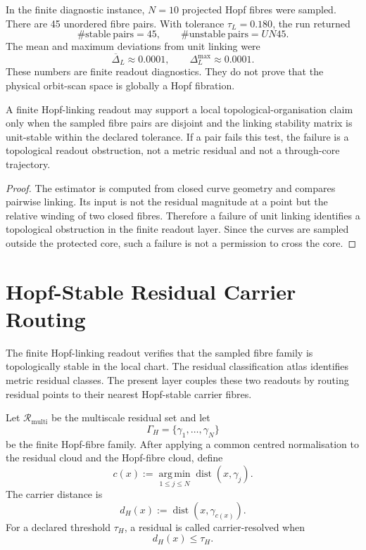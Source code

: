 \begin{remark}
In the finite diagnostic instance, \(N=10\) projected Hopf fibres were sampled.
There are 45 unordered fibre pairs. With tolerance
\(\tau_L=0.180\), the run returned
\[
    \#\mathrm{stable\ pairs}=45,
    \qquad
    \#\mathrm{unstable\ pairs}=UN45.
\]
The mean and maximum deviations from unit linking were
\[
    \overline{\Delta}_L\approx 0.0001,
    \qquad
    \Delta_L^{\max}\approx 0.0001.
\]
These numbers are finite readout diagnostics. They do not prove that the
physical orbit-scan space is globally a Hopf fibration.
\end{remark}

\begin{theorem}
A finite Hopf-linking readout may support a local topological-organisation
claim only when the sampled fibre pairs are disjoint and the linking stability
matrix is unit-stable within the declared tolerance. If a pair fails this
test, the failure is a topological readout obstruction, not a metric residual
and not a through-core trajectory.
\end{theorem}

\begin{proof}
The estimator is computed from closed curve geometry and compares pairwise
linking. Its input is not the residual magnitude at a point but the relative
winding of two closed fibres. Therefore a failure of unit linking identifies a
topological obstruction in the finite readout layer. Since the curves are
sampled outside the protected core, such a failure is not a permission to cross
the core.
\end{proof}



\section{Hopf-Stable Residual Carrier Routing}
\label{sec:hopf-stable-residual-carrier-routing}

The finite Hopf-linking readout verifies that the sampled fibre family is
topologically stable in the local chart.  The residual classification atlas
identifies metric residual classes.  The present layer couples these two
readouts by routing residual points to their nearest Hopf-stable carrier
fibres.

\begin{definition}
Let \(\mathcal R_{\mathrm{multi}}\) be the multiscale residual set and let
\[
    \Gamma_H=\{\gamma_1,\ldots,\gamma_N\}
\]
be the finite Hopf-fibre family.  After applying a common centred
normalisation to the residual cloud and the Hopf-fibre cloud, define
\[
    c(x)
    :=
    \operatorname*{arg\,min}_{1\leq j\leq N}
    \operatorname{dist}(x,\gamma_j).
\]
The carrier distance is
\[
    d_H(x):=\operatorname{dist}(x,\gamma_{c(x)}).
\]
For a declared threshold \(\tau_H\), a residual is called carrier-resolved when
\[
    d_H(x)\leq \tau_H.
\]
\end{definition}

